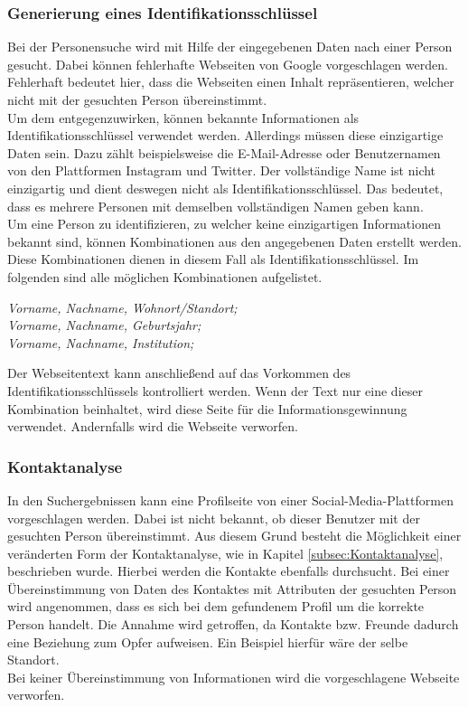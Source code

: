 		\subsubsection{Generierung eines Identifikationsschlüssel}
		\label{subsubsec:VorlaeufigInhaltskontrolle}
		Bei der Personensuche wird mit Hilfe der eingegebenen Daten nach einer Person gesucht. Dabei können fehlerhafte Webseiten von Google vorgeschlagen werden. Fehlerhaft bedeutet hier, dass die Webseiten einen Inhalt repräsentieren, welcher nicht mit der gesuchten Person übereinstimmt.\\ 
		Um dem entgegenzuwirken, können bekannte Informationen als Identifikationsschlüssel verwendet werden. Allerdings müssen diese einzigartige Daten sein. Dazu zählt beispielsweise die E-Mail-Adresse oder Benutzernamen von den Plattformen Instagram und Twitter. Der vollständige Name ist nicht einzigartig und dient deswegen nicht als Identifikationsschlüssel. Das bedeutet, dass es mehrere Personen mit demselben vollständigen Namen geben kann.\\
		Um eine Person zu identifizieren, zu welcher keine einzigartigen Informationen bekannt sind, können Kombinationen aus den angegebenen Daten erstellt werden. Diese Kombinationen dienen in diesem Fall als Identifikationsschlüssel. Im folgenden sind alle möglichen Kombinationen aufgelistet.
		
		\textit{Vorname, Nachname, Wohnort/Standort;}\\
		\textit{Vorname, Nachname, Geburtsjahr;}\\
		\textit{Vorname, Nachname, Institution;}
		
		Der Webseitentext kann anschließend auf das Vorkommen des Identifikationsschlüssels kontrolliert werden. Wenn der Text nur eine dieser Kombination beinhaltet, wird diese Seite für die Informationsgewinnung verwendet. Andernfalls wird die Webseite verworfen.\\

		\subsubsection{Kontaktanalyse}	
		In den Suchergebnissen kann eine Profilseite von einer Social-Media-Plattformen vorgeschlagen werden. Dabei ist nicht bekannt, ob dieser Benutzer mit der gesuchten Person übereinstimmt. Aus diesem Grund besteht die Möglichkeit einer veränderten Form der Kontaktanalyse, wie in Kapitel \ref{subsec:Kontaktanalyse}, beschrieben wurde. Hierbei werden die Kontakte ebenfalls durchsucht. Bei einer Übereinstimmung von Daten des Kontaktes mit Attributen der gesuchten Person wird angenommen, dass es sich bei dem gefundenem Profil um die korrekte Person handelt. Die Annahme wird getroffen, da Kontakte bzw. Freunde dadurch eine Beziehung zum Opfer aufweisen. Ein Beispiel hierfür wäre der selbe Standort.\\
		Bei keiner Übereinstimmung von Informationen wird die vorgeschlagene Webseite verworfen.	

